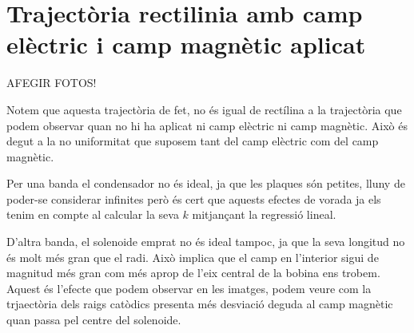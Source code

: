 \documentclass[11pt]{article}
\begin{document}
\section{Trajectòria rectilinia amb camp elèctric i camp magnètic aplicat}\label{sec: traj_no_rect}

AFEGIR FOTOS!

Notem que aquesta trajectòria de fet, no és igual de rectílina a la trajectòria que podem observar quan no hi ha aplicat ni camp elèctric ni camp magnètic. Això és degut a la no uniformitat que suposem tant del camp elèctric com del camp magnètic. 

Per una banda el condensador no és ideal, ja que les plaques són petites, lluny de poder-se considerar infinites però és cert que aquests efectes de vorada ja els tenim en compte al calcular la seva $k$ mitjançant la regressió lineal. 

D'altra banda, el solenoide emprat no és ideal tampoc, ja que la seva longitud no és molt més gran que el radi. Això implica que el camp en l'interior sigui de magnitud més gran com més aprop de l'eix central de la bobina ens trobem. Aquest és l'efecte que podem observar en les imatges, podem veure com la trjaectòria dels raigs catòdics presenta més desviació deguda al camp magnètic quan passa pel centre del solenoide.
\end{document}
